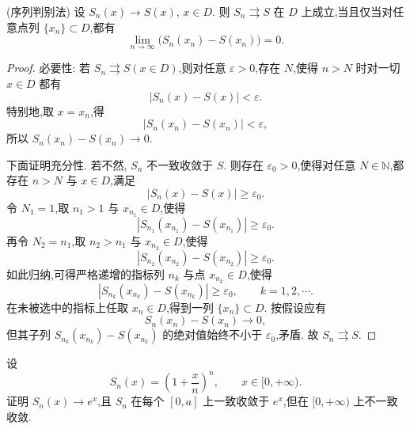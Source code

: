 \begin{proposition}(序列判别法)
	设 $S_n(x)\to S(x)$, $x\in D$. 则 $S_n\rightrightarrows S$ 在 $D$ 上成立,当且仅当对任意点列 $\{x_n\}\subset D$,都有
	\[
	\lim_{n\to\infty}\bigl(S_n(x_n)-S(x_n)\bigr)=0.
	\]
\end{proposition}

\begin{proof}
	必要性: 若 $S_n\rightrightarrows S(x\in D)$,则对任意 $\varepsilon>0$,存在 $N$,使得 $n>N$ 时对一切 $x\in D$ 都有
	\[
	|S_n(x)-S(x)|<\varepsilon.
	\]
	特别地,取 $x=x_n$,得
	\[
	|S_n(x_n)-S(x_n)|<\varepsilon,
	\]
	所以 $S_n(x_n)-S(x_n)\to0$.
	
	下面证明充分性. 若不然, $S_n$ 不一致收敛于 $S$. 则存在 $\varepsilon_0>0$,使得对任意 $N\in\mathbb{N}$,都存在 $n>N$ 与 $x\in D$,满足
	\[
	|S_n(x)-S(x)|\geq \varepsilon_0.
	\]
	令 $N_1=1$,取 $n_1>1$ 与 $x_{n_1}\in D$,使得
	\[
	|S_{n_1}(x_{n_1})-S(x_{n_1})|\geq \varepsilon_0.
	\]
	再令 $N_2=n_1$,取 $n_2>n_1$ 与 $x_{n_2}\in D$,使得
	\[
	|S_{n_2}(x_{n_2})-S(x_{n_2})|\geq \varepsilon_0.
	\]
	如此归纳,可得严格递增的指标列 $n_k$ 与点 $x_{n_k}\in D$,使得
	\[
	|S_{n_k}(x_{n_k})-S(x_{n_k})|\geq \varepsilon_0,
	\qquad k=1,2,\cdots .
	\]
	在未被选中的指标上任取 $x_n\in D$,得到一列 $\{x_n\}\subset D$. 按假设应有
	\[
	S_n(x_n)-S(x_n)\to0,
	\]
	但其子列 $S_{n_k}(x_{n_k})-S(x_{n_k})$ 的绝对值始终不小于 $\varepsilon_0$,矛盾. 故 $S_n\rightrightarrows S$.
\end{proof}
\begin{example}
	设
	\[
	S_n(x)=\left(1+\frac{x}{n}\right)^n,
	\qquad x\in[0,+\infty).
	\]
	证明 $S_n(x)\to e^x$,且 $S_n$ 在每个 $[0,a]$ 上一致收敛于 $e^x$,但在 $[0,+\infty)$ 上不一致收敛.
\end{example}


